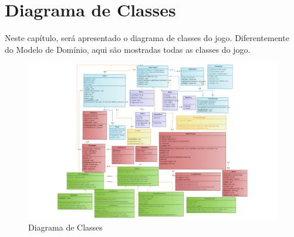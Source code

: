 \chapter[Diagrama de Classes]{Diagrama de Classes}

Neste capítulo, será apresentado o diagrama de classes do jogo. Diferentemente do Modelo de Domínio, aqui são mostradas todas as classes do jogo.

\begin{figure}[H]
\centering\includegraphics[scale=0.4]{figuras/diagramaDeClasses.png}
\caption{Diagrama de Classes}
\end{figure}